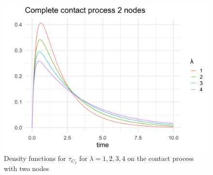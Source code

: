 \documentclass{article}
\theoremstyle{plain}
\theoremstyle{definition}
\theoremstyle{remark}
\numberwithin{equation}{section}
\begin{document}




\begin{figure}[H]
  \centering
    \includegraphics[width=.80\textwidth]{figures/complete_2_contact_phase_densities.png}
   \caption{Density functions for $\tau_{C_2}$ for $\lambda = 1, 2, 3, 4$ on the contact process with two nodes}
  \label{fig:contact_2_phase_densities}
\end{figure}
\end{document}

